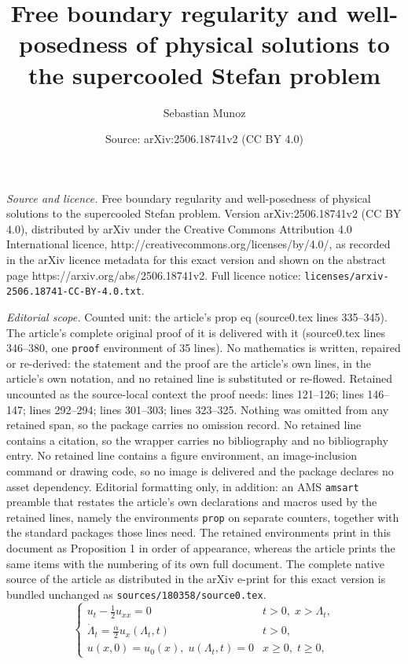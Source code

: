 \documentclass[10pt,a4paper]{amsart}
\title{Free boundary regularity and well-posedness of physical solutions to the supercooled Stefan problem}
\author{Sebastian Munoz}
\date{Source: arXiv:2506.18741v2 (CC BY 4.0)}
\begin{document}
\maketitle

\noindent\emph{Source and licence.} Free boundary regularity and well-posedness of physical solutions to the supercooled Stefan problem. Version arXiv:2506.18741v2 (CC BY 4.0), distributed by arXiv under the Creative Commons Attribution 4.0 International licence, http://creativecommons.org/licenses/by/4.0/, as recorded in the arXiv licence metadata for this exact version and shown on the abstract page https://arxiv.org/abs/2506.18741v2. Full licence notice: \texttt{licenses/arxiv-2506.18741-CC-BY-4.0.txt}.\par\smallskip

\noindent\textit{Editorial scope.} Counted unit: the article's prop eq (source0.tex lines 335--345). The article's complete original proof of it is delivered with it (source0.tex lines 346--380, one \texttt{proof} environment of 35 lines). No mathematics is written, repaired or re-derived: the statement and the proof are the article's own lines, in the article's own notation, and no retained line is substituted or re-flowed.  Retained uncounted as the source-local context the proof needs: lines 121--126; lines 146--147; lines 292--294; lines 301--303; lines 323--325.  Nothing was omitted from any retained span, so the package carries no omission record.  No retained line contains a citation, so the wrapper carries no bibliography and no bibliography entry.  No retained line contains a figure environment, an image-inclusion command or drawing code, so no image is delivered and the package declares no asset dependency.  Editorial formatting only, in addition: an AMS \texttt{amsart} preamble that restates the article's own declarations and macros used by the retained lines, namely the environments \texttt{prop} on separate counters, together with the standard packages those lines need.  The retained environments print in this document as Proposition 1 in order of appearance, whereas the article prints the same items with the numbering of its own full document.  The complete native source of the article as distributed in the arXiv e-print for this exact version is bundled unchanged as \texttt{sources/180358/source0.tex}.
\begin{equation}\begin{cases} \label{supercooled eqs}
    u_t - \frac{1}{2} u_{xx}= 0 & t>0,\; x>\Lambda_t,\\
\dot{\Lambda}_t = \frac{\alpha}{2} u_x(\Lambda_t,t) & t > 0,\\
u(x,0) = u_0(x),\; u(\Lambda_t,t) = 0 & x\geq 0,\; t\geq 0,
\end{cases}
\end{equation}
\end{document}
